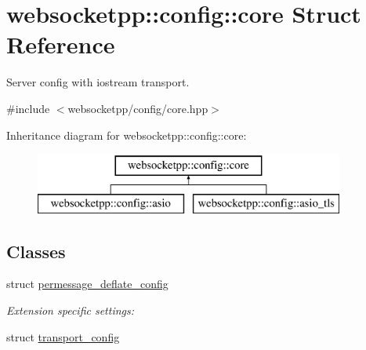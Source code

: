 \hypertarget{structwebsocketpp_1_1config_1_1core}{}\section{websocketpp\+:\+:config\+:\+:core Struct Reference}
\label{structwebsocketpp_1_1config_1_1core}


Server config with iostream transport.  




{\ttfamily \#include $<$websocketpp/config/core.\+hpp$>$}

Inheritance diagram for websocketpp\+:\+:config\+:\+:core\+:\begin{figure}[H]
\begin{center}
\leavevmode
\includegraphics[height=2.000000cm]{structwebsocketpp_1_1config_1_1core}
\end{center}
\end{figure}
\subsection*{Classes}
\begin{DoxyCompactItemize}
\item 
struct \hyperlink{structwebsocketpp_1_1config_1_1core_1_1permessage__deflate__config}{permessage\+\_\+deflate\+\_\+config}
\begin{DoxyCompactList}\small\item\em Extension specific settings\+: \end{DoxyCompactList}\item 
struct \hyperlink{structwebsocketpp_1_1config_1_1core_1_1transport__config}{transport\+\_\+config}
\end{DoxyCompactItemize}
